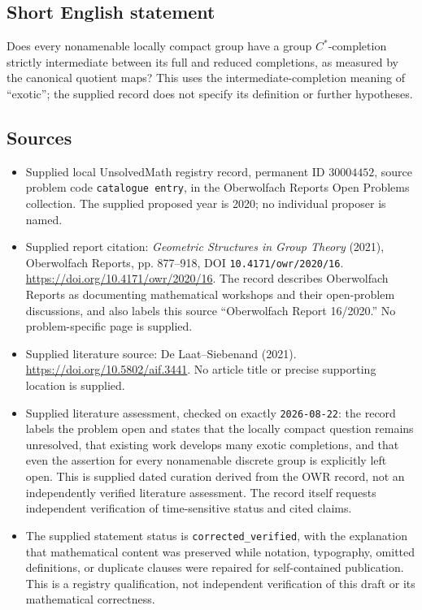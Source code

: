 \documentclass[11pt]{article}
\begin{document}
\subsection{Short English statement}
Does every nonamenable locally compact group have a group \(C^*\)-completion strictly intermediate between its full and reduced completions, as measured by the canonical quotient maps? This uses the intermediate-completion meaning of ``exotic''; the supplied record does not specify its definition or further hypotheses.
\subsection{Sources}
\begin{itemize}
\item Supplied local UnsolvedMath registry record, permanent ID \(30004452\), source problem code \texttt{catalogue entry}, in the Oberwolfach Reports Open Problems collection. The supplied proposed year is 2020; no individual proposer is named.
\item Supplied report citation: \emph{Geometric Structures in Group Theory} (2021), Oberwolfach Reports, pp. 877--918, DOI \texttt{10.4171/owr/2020/16}. \url{https://doi.org/10.4171/owr/2020/16}. The record describes Oberwolfach Reports as documenting mathematical workshops and their open-problem discussions, and also labels this source ``Oberwolfach Report 16/2020.'' No problem-specific page is supplied.
\item Supplied literature source: De Laat--Siebenand (2021). \url{https://doi.org/10.5802/aif.3441}. No article title or precise supporting location is supplied.
\item Supplied literature assessment, checked on exactly \texttt{2026-08-22}: the record labels the problem open and states that the locally compact question remains unresolved, that existing work develops many exotic completions, and that even the assertion for every nonamenable discrete group is explicitly left open. This is supplied dated curation derived from the OWR record, not an independently verified literature assessment. The record itself requests independent verification of time-sensitive status and cited claims.
\item The supplied statement status is \texttt{corrected\_verified}, with the explanation that mathematical content was preserved while notation, typography, omitted definitions, or duplicate clauses were repaired for self-contained publication. This is a registry qualification, not independent verification of this draft or its mathematical correctness.
\end{itemize}
\end{document}
